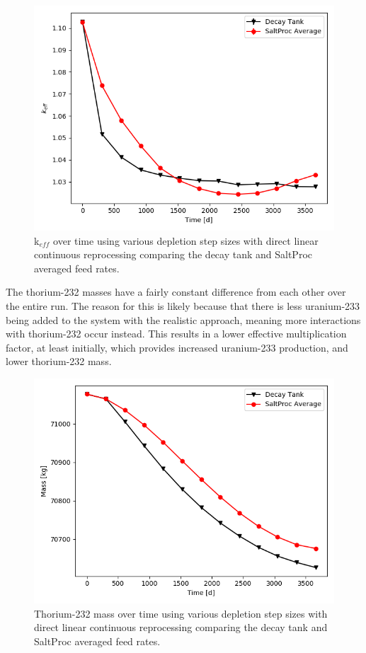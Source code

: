 \begin{figure}[H]
  \centering
  \includegraphics[scale=0.7]{images/adv-keff.png}
  \caption{k$_{eff}$ over time using various depletion step sizes with direct linear continuous reprocessing comparing the decay tank and SaltProc averaged feed rates.}
   \label{fig:DL-cont-k-adv}
\end{figure}

The thorium-232 masses have a fairly constant difference from each other over the entire run. The reason for this is likely because that there is less uranium-233 being added to the system with the realistic approach, meaning more interactions with thorium-232 occur instead. This results in a lower effective multiplication factor, at least initially, which provides increased uranium-233 production, and lower thorium-232 mass.

\begin{figure}[H]
  \centering
  \includegraphics[scale=0.7]{images/adv-Th232.png}
  \caption{Thorium-232 mass over time using various depletion step sizes with direct linear continuous reprocessing comparing the decay tank and SaltProc averaged feed rates.}
   \label{fig:DL-cont-th-adv}
\end{figure}

